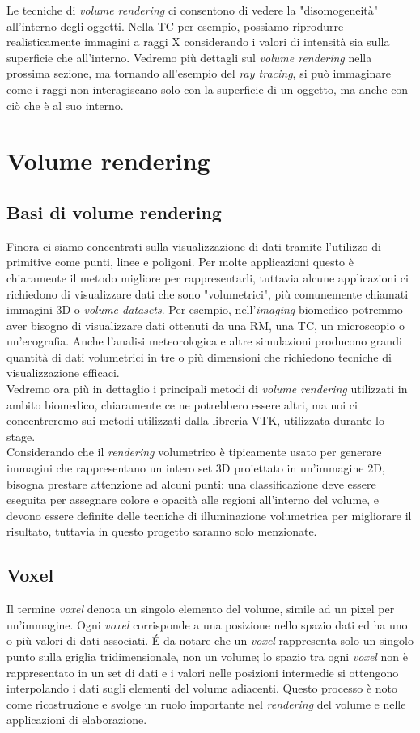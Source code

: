 Le tecniche di \emph{volume rendering} ci consentono di vedere la "disomogeneità" all'interno degli oggetti. Nella TC per esempio, possiamo riprodurre realisticamente immagini a raggi X considerando i valori di intensità sia sulla superficie che all'interno. Vedremo più dettagli sul \emph{volume rendering} nella prossima sezione, ma tornando all'esempio del \emph{ray tracing}, si può immaginare come i raggi non interagiscano solo con la superficie di un oggetto, ma anche con ciò che è al suo interno.

\section{Volume rendering}
\subsection{Basi di volume rendering}\label{sec:volume-rendering-details}
Finora ci siamo concentrati sulla visualizzazione di dati tramite l'utilizzo di primitive come punti, linee e poligoni. Per molte applicazioni questo è chiaramente il metodo migliore per rappresentarli, tuttavia alcune applicazioni ci richiedono di visualizzare dati che sono "volumetrici", più comunemente chiamati immagini 3D o \emph{volume datasets}. Per esempio, nell'\emph{imaging} biomedico potremmo aver bisogno di visualizzare dati ottenuti da una RM, una TC, un microscopio o un'ecografia. Anche l'analisi meteorologica e altre simulazioni producono grandi quantità di dati volumetrici in tre o più dimensioni che richiedono tecniche di visualizzazione efficaci.
\\
Vedremo ora più in dettaglio i principali metodi di \emph{volume rendering} utilizzati in ambito biomedico, chiaramente ce ne potrebbero essere altri, ma noi ci concentreremo sui metodi utilizzati dalla libreria VTK, utilizzata durante lo stage.
\\
Considerando che il \emph{rendering} volumetrico è tipicamente usato per generare immagini che rappresentano un intero set 3D proiettato in un'immagine 2D, bisogna prestare attenzione ad alcuni punti: una classificazione deve essere eseguita per assegnare colore e opacità alle regioni all'interno del volume, e devono essere definite delle tecniche di illuminazione volumetrica per migliorare il risultato, tuttavia in questo progetto saranno solo menzionate.

\subsection{Voxel}
Il termine \emph{voxel} denota un singolo elemento del volume, simile ad un pixel per un'immagine. Ogni \emph{voxel} corrisponde a una posizione nello spazio dati ed ha uno o più valori di dati associati. \'E da notare che un \emph{voxel} rappresenta solo un singolo punto sulla griglia tridimensionale, non un volume; lo spazio tra ogni \emph{voxel} non è rappresentato in un set di dati e i valori nelle posizioni intermedie si ottengono interpolando i dati sugli elementi del volume adiacenti. Questo processo è noto come ricostruzione e svolge un ruolo importante nel \emph{rendering} del volume e nelle applicazioni di elaborazione.

